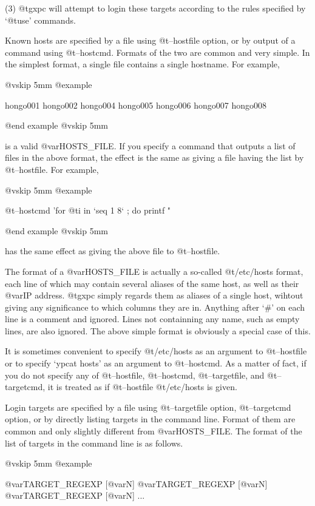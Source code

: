 (3) @t{gxpc} will attempt to login these targets according to the
rules specified by `@t{use}' commands.

Known hosts are specified by a file using @t{--hostfile} option, or
by output of a command using @t{--hostcmd}. Formats of the two are
common and very simple. In the simplest format, a single file
contains a single hostname. For example,

@vskip 5mm
@example

   hongo001
   hongo002
   hongo004
   hongo005
   hongo006
   hongo007
   hongo008

@end example
@vskip 5mm

is a valid @var{HOSTS_FILE}. If you specify a command that outputs
a list of files in the above format, the effect is the same
as giving a file having the list by @t{--hostfile}. For example,

@vskip 5mm
@example

  @t{--hostcmd} 'for @t{i} in `seq 1 8` ; do printf "%

@end example
@vskip 5mm

has the same effect as giving the above file to @t{--hostfile}.

The format of a @var{HOSTS_FILE} is actually a so-called @t{/etc/hosts}
format, each line of which may contain several aliases of the
same host, as well as their @var{IP} address. @t{gxpc} simply regards them
as aliases of a single host, wihtout giving any significance to
which columns they are in. Anything after `#' on each line is a
comment and ignored. Lines not containning any name, such as
empty lines, are also ignored.  The above simple format is
obviously a special case of this.

It is sometimes convenient to specify @t{/etc/hosts} as an argument
to @t{--hostfile} or to specify `ypcat hosts' as an argument to
@t{--hostcmd}. As a matter of fact, if you do not specify any of
@t{--hostfile}, @t{--hostcmd}, @t{--targetfile}, and @t{--targetcmd}, it is
treated as if @t{--hostfile} @t{/etc/hosts} is given.

Login targets are specified by a file using @t{--targetfile} option,
@t{--targetcmd} option, or by directly listing targets in the command
line. Format of them are common and only slightly different from
@var{HOSTS_FILE}.  The format of the list of targets in the command
line is as follows.

@vskip 5mm
@example

   @var{TARGET_REGEXP} [@var{N}] @var{TARGET_REGEXP} [@var{N}] @var{TARGET_REGEXP} [@var{N}] ...

